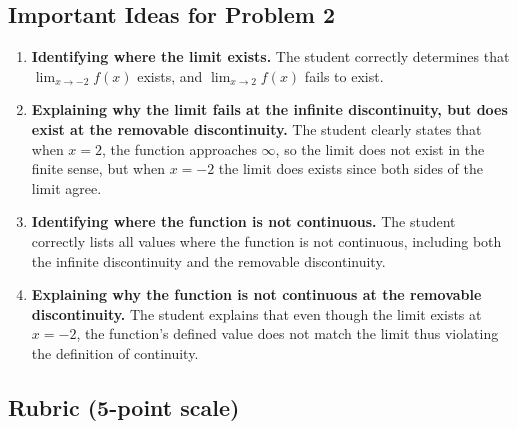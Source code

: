\documentclass[11pt]{article}
\begin{document}
\subsection*{Important Ideas for Problem 2}

\begin{enumerate}
    \item \textbf{Identifying where the limit exists.}  
    The student correctly determines that $\displaystyle{\lim_{x\to -2}f(x)}$ exists, and $\displaystyle{\lim_{x\to 2}f(x)}$ fails to exist.

    \item \textbf{Explaining why the limit fails at the infinite discontinuity, but does exist at the removable discontinuity.}  
    The student clearly states that when $x = 2$, the function approaches $\infty$, so the limit does not exist in the finite sense, but when $x = -2$ the limit does exists since both sides of the limit agree.

    \item \textbf{Identifying where the function is not continuous.}  
    The student correctly lists all values where the function is not continuous, including both the infinite discontinuity and the removable discontinuity.

    \item \textbf{Explaining why the function is not continuous at the removable discontinuity.}  
    The student explains that even though the limit exists at $x = -2$, the function’s defined value does not match the limit thus violating the definition of continuity.
\end{enumerate}

\subsection*{Rubric (5-point scale)}
\end{document}
